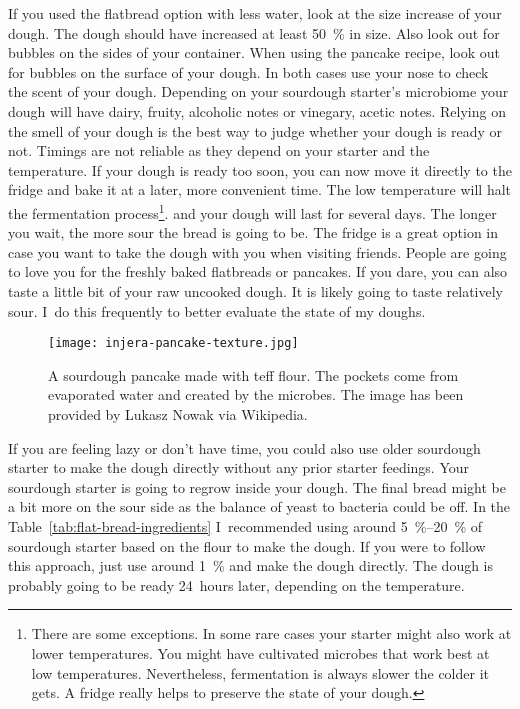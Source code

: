 If you used the flatbread option with less water, look at the size increase
of your dough. The dough should have increased at least \qty{50}{\percent} in size.
Also look out for bubbles on the sides of your container.
When using the pancake recipe, look out for bubbles on the surface of your dough.
In both cases use your nose to check the scent of your dough. Depending
on your sourdough starter's microbiome your dough will have
dairy, fruity, alcoholic notes or vinegary, acetic notes. Relying
on the smell of your dough is the best way to judge whether your
dough is ready or not. Timings are not reliable as they
depend on your starter and the temperature. If your dough
is ready too soon, you can now move it directly to the fridge and bake
it at a later, more convenient time. The low temperature will halt the fermentation
process\footnote{There are some exceptions. In some rare cases your starter
might also work at lower temperatures. You might have cultivated microbes that work best at
low temperatures. Nevertheless, fermentation
is always slower the colder it gets. A fridge really helps to preserve the state
of your dough.}.
and your dough will last for several days. The longer you wait, the more sour the
bread is going to be. The fridge is a great option in case you want to
take the dough with you when visiting friends. People are going
to love you for the freshly baked flatbreads or pancakes. If you dare,
you can also taste a little bit of your raw uncooked dough. It is likely
going to taste relatively sour. I~do this frequently to better evaluate the
state of my doughs.


\begin{figure}[htb!]
\begin{center}
  \texttt{[image: injera-pancake-texture.jpg]}
  \caption{A sourdough pancake made with teff flour. The pockets come from
  evaporated water and  created by the microbes.
  The image has been provided by Lukasz Nowak via Wikipedia.}
\end{center}
\end{figure}

If you are feeling lazy or don't have time, you could also use older sourdough starter
to make the dough directly without any prior starter feedings. Your sourdough starter
is going to regrow inside your dough. The
final bread might be a bit more on the sour side as the balance of yeast to
bacteria could be off. In the Table~\ref{tab:flat-bread-ingredients}
I~recommended using around \qtyrange{5}{20}{\percent}
of sourdough starter based on the flour to make the dough. If you were to follow
this approach, just use around \qty{1}{\percent} and make the dough directly.
The dough is probably going to be ready 24~hours later, depending on the temperature.

